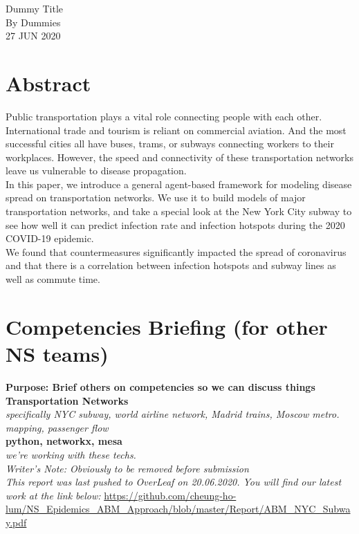 \documentclass[12pt, a4, epsf] {article}
\theoremstyle{plain}
\theoremstyle{definition}
\begin{document}
\begin{center}

{\Large Dummy Title\\}
By Dummies \\
27 JUN 2020
\end{center}

\section*{Abstract}
Public transportation plays a vital role connecting people with each other. International trade and tourism is reliant on commercial aviation. And the most successful cities all have buses, trams, or subways connecting workers to their workplaces. However, the speed and connectivity of these transportation networks leave us vulnerable to disease propagation.\\

In this paper, we introduce a general agent-based framework for modeling disease spread on transportation networks. We use it to build models of major transportation networks, and take a special look at the New York City subway to see how well it can predict infection rate and infection hotspots during the 2020 COVID-19 epidemic.\\

We found that countermeasures significantly impacted the spread of coronavirus and that there is a correlation between infection hotspots and subway lines as well as commute time.

\section*{Competencies Briefing (for other NS teams)}
\textbf{Purpose: Brief others on competencies so we can discuss things\\}
\textbf{Transportation Networks\\}
\textit{specifically NYC subway, world airline network, Madrid trains, Moscow metro. mapping, passenger flow\\}
\textbf{python, networkx, mesa\\}
\textit{we're working with these techs.\\}
\textit{Writer's Note: Obviously to be removed before submission\\}
\textit{This report was last pushed to OverLeaf on 20.06.2020. You will find our latest work at the link below:}
\url{https://github.com/cheung-ho-lum/NS_Epidemics_ABM_Approach/blob/master/Report/ABM_NYC_Subway.pdf}
\end{document}
